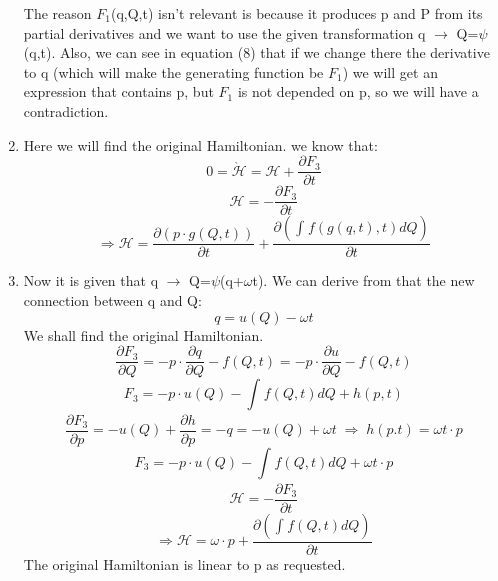 \documentclass[11pt,fleqn]{article}
\begin{document}
\begin{enumerate}
The reason $F_1$(q,Q,t) isn't relevant is because it produces p and P from its partial derivatives and we want to use the given transformation q $\to$ Q=$\psi$(q,t). Also, we can see in equation  (8) that if we change there the derivative to q (which will make the generating function be $F_1$) we will get an expression that contains p, but $F_1$ is not depended on p, so we will have a contradiction.
\item Here we will find the original Hamiltonian.
\newline
we know that:
\begin{equation}
0=\grave{\mathcal{H}}=\mathcal{H}+\frac{\partial F_{3}}{\partial t}
\end{equation}
\begin{equation}
\mathcal{H}=-\frac{\partial F_{3}}{\partial t}
\end{equation}
\begin{equation}
\Rightarrow\boxed{\mathcal{H}=\frac{\partial (p\cdot g(Q,t))}{\partial t}+\frac{\partial (\int_{}^{}f(g(q,t),t)dQ)}{\partial t}}
\end{equation}
\item Now it is given that q $\to$ Q=$\psi$(q+$\omega$t). We can derive from that the new connection between q and Q:
\begin{equation}
q=u(Q)-\omega t
\end{equation}
We shall find the original Hamiltonian.
\begin{equation}
\frac{\partial F_{3}}{\partial Q}=-p\cdot\frac{\partial q}{\partial Q}-f(Q,t)=-p\cdot \frac{\partial u}{\partial Q} -f(Q,t)
\end{equation}
\begin{equation}
F_{3}=-p\cdot u(Q)-\int_{}^{} f(Q,t)dQ+h(p,t)
\end{equation}
\begin{equation}
\frac{\partial F_{3}}{\partial p}=-u(Q)+\frac{\partial h}{\partial p}=-q=-u(Q)+\omega t \; \Rightarrow\; h(p.t)=\omega t \cdot p
\end{equation}
\begin{equation}
F_{3}=-p\cdot u(Q)-\int_{}^{} f(Q,t)dQ+ \omega t \cdot p
\end{equation}
\begin{equation}
\mathcal{H}=-\frac{\partial F_{3}}{\partial t}
\end{equation}
\begin{equation}
\Rightarrow\boxed{\mathcal{H}=\omega \cdot p+ \frac{\partial (\int_{}^{}f(Q,t)dQ)}{\partial t}}
\end{equation}
The original Hamiltonian is linear to p as requested.
\end{enumerate}

\end{document}
